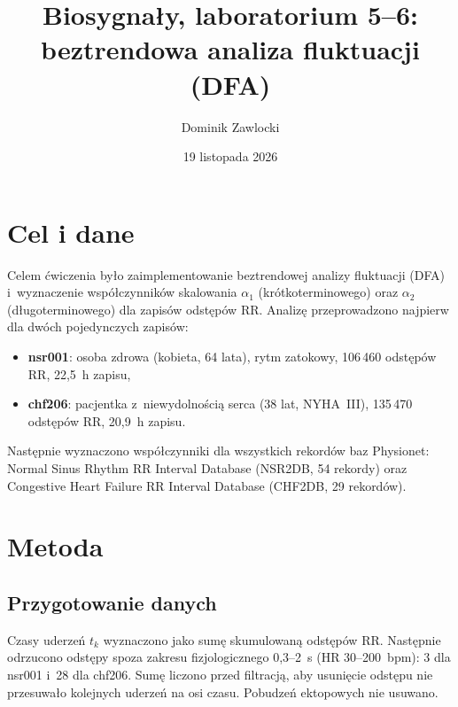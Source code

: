 \documentclass[11pt,a4paper]{article}
\title{Biosygnały, laboratorium 5--6:\\beztrendowa analiza fluktuacji (DFA)}
\author{Dominik Zawlocki}
\date{19 listopada 2026}
\begin{document}
\maketitle

\section{Cel i dane}
Celem ćwiczenia było zaimplementowanie beztrendowej analizy fluktuacji (DFA) i~wyznaczenie współczynników skalowania $\alpha_1$ (krótkoterminowego) oraz $\alpha_2$ (długoterminowego) dla zapisów odstępów RR. Analizę przeprowadzono najpierw dla dwóch pojedynczych zapisów:
\begin{itemize}
  \item \textbf{nsr001}: osoba zdrowa (kobieta, 64 lata), rytm zatokowy, 106\,460 odstępów RR, 22,5~h zapisu,
  \item \textbf{chf206}: pacjentka z~niewydolnością serca (38 lat, NYHA~III), 135\,470 odstępów RR, 20,9~h zapisu.
\end{itemize}
Następnie wyznaczono współczynniki dla wszystkich rekordów baz Physionet: Normal Sinus Rhythm RR Interval Database (NSR2DB, 54 rekordy) oraz Congestive Heart Failure RR Interval Database (CHF2DB, 29 rekordów).

\section{Metoda}
\subsection{Przygotowanie danych}
Czasy uderzeń $t_k$ wyznaczono jako sumę skumulowaną odstępów RR. Następnie odrzucono odstępy spoza zakresu fizjologicznego 0,3--2~s (HR 30--200~bpm): 3 dla nsr001 i~28 dla chf206. Sumę liczono przed filtracją, aby usunięcie odstępu nie przesuwało kolejnych uderzeń na osi czasu. Pobudzeń ektopowych nie usuwano.
\end{document}
